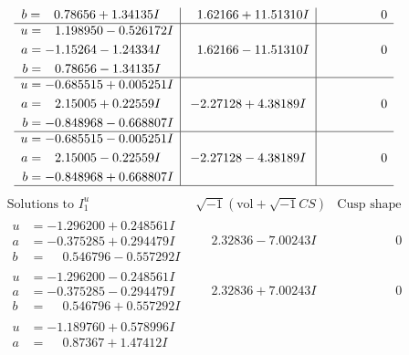 \documentclass[1p]{elsarticle_modified}
\theoremstyle{definition}
\newcommand{\I}{\sqrt{-1}}
\begin{document}
$$\begin{array}{c|c|c}
\begin{aligned}
b &= \phantom{-}0.78656 + 1.34135 I\end{aligned}
 & \phantom{-}1.62166 + 11.51310 I & \phantom{-0.000000 } 0 \\ \hline\begin{aligned}
u &= \phantom{-}1.198950 - 0.526172 I \\
a &= -1.15264 - 1.24334 I \\
b &= \phantom{-}0.78656 - 1.34135 I\end{aligned}
 & \phantom{-}1.62166 - 11.51310 I & \phantom{-0.000000 } 0 \\ \hline\begin{aligned}
u &= -0.685515 + 0.005251 I \\
a &= \phantom{-}2.15005 + 0.22559 I \\
b &= -0.848968 - 0.668807 I\end{aligned}
 & -2.27128 + 4.38189 I & \phantom{-0.000000 } 0 \\ \hline\begin{aligned}
u &= -0.685515 - 0.005251 I \\
a &= \phantom{-}2.15005 - 0.22559 I \\
b &= -0.848968 + 0.668807 I\end{aligned}
 & -2.27128 - 4.38189 I & \phantom{-0.000000 } 0\\
 \hline 
 \end{array}$$\newpage$$\begin{array}{c|c|c}  
\text{Solutions to }I^u_{1}& \I (\text{vol} + \sqrt{-1}CS) & \text{Cusp shape}\\
 \hline 
\begin{aligned}
u &= -1.296200 + 0.248561 I \\
a &= -0.375285 + 0.294479 I \\
b &= \phantom{-}0.546796 - 0.557292 I\end{aligned}
 & \phantom{-}2.32836 - 7.00243 I & \phantom{-0.000000 } 0 \\ \hline\begin{aligned}
u &= -1.296200 - 0.248561 I \\
a &= -0.375285 - 0.294479 I \\
b &= \phantom{-}0.546796 + 0.557292 I\end{aligned}
 & \phantom{-}2.32836 + 7.00243 I & \phantom{-0.000000 } 0 \\ \hline\begin{aligned}
u &= -1.189760 + 0.578996 I \\
a &= \phantom{-}0.87367 + 1.47412 I \\

\end{aligned}
\end{array}$$
\end{document}
